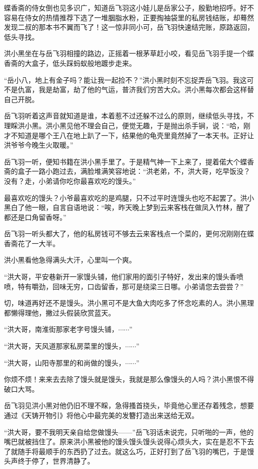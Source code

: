 蝶香斋的侍女倒也见多识广，知道岳飞羽这小娃儿是岳家公子，殷勤地招呼。好不容易在侍女的热情推荐下选了一堆胭脂水粉，正要掏袖袋里的私房钱结账，却蓦然发现二叔的那本书不翼而飞了！这一惊非同小可，岳飞羽快速结完账，原路返回，低头寻找。

洪小黑坐在与岳飞羽相撞的路边，正摇着一根茅草赶小咬，看见岳飞羽手提一个蝶香斋的大盒子，低头踩蚂蚁般地踱步走来。

“岳小八，地上有金子吗？能让我一起捡不？”洪小黑时刻不忘捉弄岳飞羽。我这可不是仇富，我是劫富，劫了他的气运，普济我们穷苦大众。洪小黑每次都会这样替自己开脱。

岳飞羽听着这声音就知道是谁，本着惹不过还躲不过么的原则，继续低头寻找，不理睬洪小黑。洪小黑见他不理会自己，便觉无趣，于是抛出杀手锏，说：“哈，刚才不知道是哪个王八在地上趴了一下，结果他的龟壳里竟然掉了一本天书。正好让洪爷爷今晚生火取暖。”

岳飞羽一听，便知书籍在洪小黑手里了。于是精气神一下上来了，提着偌大个蝶香斋的盒子一路小跑过去，满脸堆满笑容地说：“洪老弟，不，洪大哥，吃早饭没？没有？走，小弟请你吃你最喜欢吃的馒头。”

最喜欢吃的馒头？小爷最喜欢吃的是鸡腿，只不过平时连馒头也吃不起罢了。洪小黑白了他一眼，自言自语地说：“唉，昨天晚上梦到云来客栈在做凤入竹林，醒了都还是口角留香呀。”

岳飞羽一听头都大了，他的私房钱可不够去云来客栈点一个菜的，更何况刚刚在蝶香斋花了一大半。

洪小黑看他急得满头大汗，心里叫一个爽。

“洪大哥，平安巷新开一家馒头铺，他们家用的面引子特好，发出来的馒头香喷喷，特有嚼劲，回味无穷，口齿留香，那可是绕梁三日哪。小弟请您去尝尝？”

切，味道再好还不是馒头。洪小黑可不是大鱼大肉吃多了怀念吃素的人。洪小黑理都懒得理他，撇过头假装欣赏蓝天。

“洪大哥，南淮街那家老字号馒头铺，$\cdots\cdots$”

“洪大哥，天风道那家私房菜里的馒头，$\cdots\cdots$”

“洪大哥，山阳寺那里的和尚做的馒头，$\cdots\cdots$”

你烦不烦！来来去去除了馒头就是馒头，我就是那么像馒头的人吗？洪小黑恨不得破口大骂。

岳飞羽见洪小黑对他仍旧不理不睬，急得搔首挠头，毕竟他心里还存着残念，想要通过《天铸开物引》将他心中最完美的发簪打造出来送给无双。

“洪大哥，要不我明天亲自给您做馒头------”岳飞羽话未说完，只听啪的一声，他的嘴巴就被挡住了。原来洪小黑被他的馒头馒头馒头说得心烦头大，实在是忍不下去了就随手将最顺手的东西扔了过去。就这么巧，正好打到了岳飞羽的嘴巴，于是馒头声终于停了，世界清静了。

